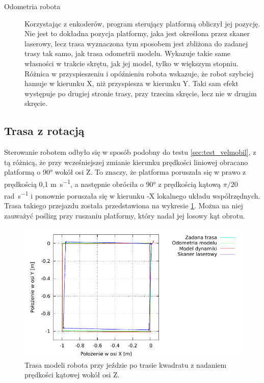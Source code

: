 \begin{description}
				\item[Odometria robota] Korzystając z enkoderów, program sterujący platformą obliczył jej pozycję. Nie jest to dokładna pozycja platformy, jaka jest określona przez skaner laserowy, lecz trasa wyznaczona tym sposobem jest zbliżona do zadanej trasy tak samo, jak trasa odometrii modelu. 
				Wykazuje takie same własności w trakcie skrętu, jak jej model, tylko w większym stopniu. Różnica w przyspieszeniu i opóźnieniu robota wskazuje, że 
				robot szybciej hamuje w kierunku X, niż przyspiesza w kierunku Y. Taki sam efekt występuje po drugiej stronie trasy, przy trzecim skręcie, lecz nie w drugim skręcie.
			\end{description}

	\subsection{Trasa z rotacją}
		\label{sec:test_velmobil_rot}
		Sterowanie robotem odbyło się w sposób podobny do testu \ref{sec:test_velmobil}, z tą różnicą, że przy wcześniejszej zmianie kierunku prędkości liniowej obracano platformą o 90° wokół osi Z. To znaczy, że platforma poruszała się w prawo z prędkością 0,1 \si{\metre\per\second}, a następnie obróciła o 90° 
		z prędkością kątową $\pi/20$ \si{\radian\per\second} i ponownie poruszała się w kierunku -X lokalnego układu współrzędnych.
		Trasa takiego przejazdu została przedstawiona na wykresie \ref{plot:velmobil_rot_xy}.
		Można na niej zauważyć poślizg przy ruszaniu platformy, który nadał jej losowy kąt obrotu.
		
		\begin{figure}[H]
			\centering
			\includegraphics[width=\textwidth]{plots/velmobil_rot_xy.pdf}
				\caption{Trasa modeli robota przy jeździe po trasie kwadratu z nadaniem prędkości kątowej wokół osi Z.}
			\label{plot:velmobil_rot_xy}
		\end{figure}
		
